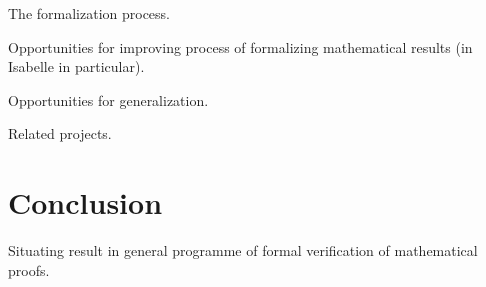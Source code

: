 \documentclass{amsart}
\theoremstyle{definition}
\theoremstyle{remark}
\begin{document}
The formalization process.

Opportunities for improving process of formalizing mathematical results (in Isabelle in particular).

Opportunities for generalization.

Related projects.

\section{Conclusion} \label{End}

Situating result in general programme of formal verification of mathematical proofs.



\end{document}
